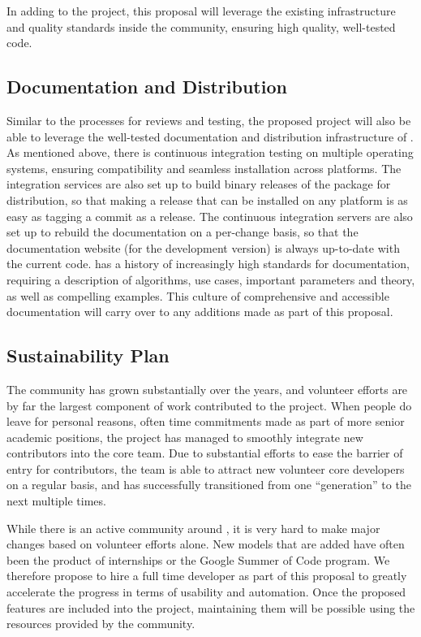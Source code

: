 In adding to the \sklearn{} project, this proposal will leverage the existing infrastructure
and quality standards inside the \sklearn{} community, ensuring high quality, well-tested code.

\subsection{Documentation and Distribution}
Similar to the processes for reviews and testing, the proposed project will
also be able to leverage the well-tested documentation and distribution
infrastructure of \sklearn{}.
As mentioned above, there is continuous integration testing on multiple operating systems,
ensuring compatibility and seamless installation across platforms.
The integration services are also set up to build binary releases of the \sklearn{} package
for distribution, so that making a release that can be installed on any platform is as
easy as tagging a commit as a release.
The continuous integration servers are also set up to rebuild the documentation on a per-change
basis, so that the documentation website (for the development version) is always up-to-date
with the current code.
\sklearn{} has a history of increasingly high standards for documentation,
requiring a description of algorithms, use cases, important parameters and theory,
as well as compelling examples. This culture of comprehensive and accessible documentation
will carry over to any additions made as part of this proposal.

\subsection{Sustainability Plan}
The \sklearn{} community has grown substantially over the years, and volunteer efforts
are by far the largest component of work contributed to the project.
When people do leave for personal reasons, often time commitments made as part
of more senior academic positions, the project has managed to smoothly integrate new
contributors into the core team. Due to substantial efforts to ease the barrier
of entry for contributors, the \sklearn{} team is able to attract new volunteer
core developers on a regular basis, and has successfully transitioned from one
``generation'' to the next multiple times. 

While there is an active community around \sklearn{}, it is very hard to make
major changes based on volunteer efforts alone. New models that are added have
often been the product of internships or the Google Summer of Code program.  We
therefore propose to hire a full time developer as part of this proposal to
greatly accelerate the progress in terms of usability and automation. Once
the proposed features are included into the project, maintaining them will be
possible using the resources provided by the community. 

